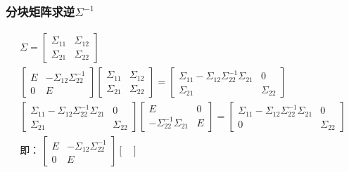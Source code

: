\documentclass{article} %
\begin{document}
    \subsubsection{分块矩阵求逆\(\Sigma^{-1}\)}
    \[
        \begin{gathered}
            \Sigma=\begin{bmatrix}
                \Sigma_{11} & \Sigma_{12}\\
                \Sigma_{21} & \Sigma_{22}
            \end{bmatrix}\\
            \begin{bmatrix}
                E & -\Sigma_{12}\Sigma_{22}^{-1}\\
                0 & E
            \end{bmatrix}
            \begin{bmatrix}
                \Sigma_{11} & \Sigma_{12}\\
                \Sigma_{21} & \Sigma_{22}
            \end{bmatrix}=
            \begin{bmatrix}
                \Sigma_{11}-\Sigma_{12}\Sigma_{22}^{-1}\Sigma_{21} & 0\\
                \Sigma_{21} & \Sigma_{22}
            \end{bmatrix}\\
            \begin{bmatrix}
                \Sigma_{11}-\Sigma_{12}\Sigma_{22}^{-1}\Sigma_{21} & 0\\
                \Sigma_{21} & \Sigma_{22}
            \end{bmatrix}
            \begin{bmatrix}
                E & 0\\
                -\Sigma_{22}^{-1}\Sigma_{21} & E
            \end{bmatrix}=
            \begin{bmatrix}
                \Sigma_{11}-\Sigma_{12}\Sigma_{22}^{-1}\Sigma_{21} & 0\\
                0 & \Sigma_{22}
            \end{bmatrix}\\
            \text{即：}\,
            \begin{bmatrix}
                E & -\Sigma_{12}\Sigma_{22}^{-1}\\
                0 & E
            \end{bmatrix}
            \begin{bmatrix}

\end{bmatrix}
\end{gathered}\]
\end{document}
